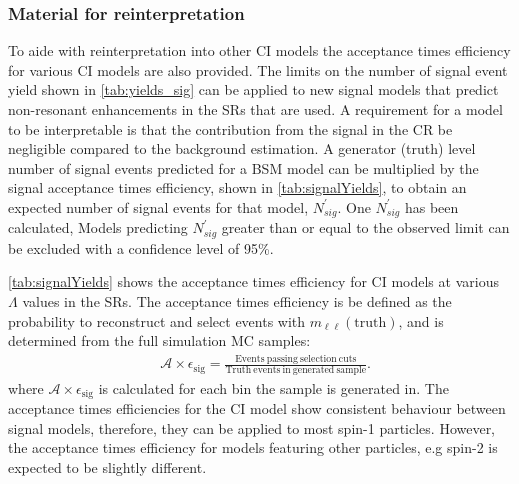 \subsubsection{Material for reinterpretation}\label{sec:results:reinterp}
To aide with reinterpretation into other CI models the acceptance times efficiency for various CI models are also provided. The limits on the number of signal event yield shown in \cref{tab:yields_sig} can be applied to new signal models that predict non-resonant enhancements in the SRs that are used. A requirement for a model to be interpretable is that the contribution from the signal in the CR be negligible compared to the background estimation. A generator (truth) level number of signal events predicted for a BSM model can be multiplied by the signal acceptance times efficiency, shown in \cref{tab:signalYields}, to obtain an expected number of signal events for that model, $N_{sig}^\prime$. One $N_{sig}^\prime$ has been calculated, Models predicting $N_{sig}^\prime$ greater than or equal to the observed limit can be excluded with a confidence level of 95\%.

\cref{tab:signalYields} shows the acceptance times efficiency for CI models at various $\Lambda$ values in the SRs. The acceptance times efficiency is be defined as the probability to reconstruct and select events with $m_{\ell\ell}(\mathrm{truth})$, and is determined from the full simulation MC samples:
\begin{equation}
    \label{eq:atimee}
    \begin{aligned}
        & \mathcal{A}\times\epsilon_\textrm{sig} = \frac{\mathrm{Events~passing~selection~cuts}}{\mathrm{Truth~events~in~generated~sample}}.
    \end{aligned}
\end{equation}
where $\mathcal{A}\times\epsilon_\textrm{sig}$ is calculated for each bin the sample is generated in. The acceptance times efficiencies for the CI model show consistent behaviour between signal models, therefore, they can be applied to most spin-1 particles. However, the acceptance times efficiency for models featuring other particles, e.g spin-2 is expected to be slightly different. 

